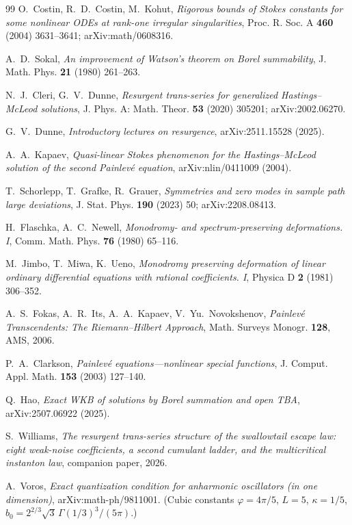 \documentclass[11pt,reqno]{amsart}
\theoremstyle{plain}
\theoremstyle{definition}
\theoremstyle{remark}
\begin{document}
\begin{thebibliography}{99}
 O.~Costin, R.~D.~Costin, M.~Kohut, \emph{Rigorous bounds of Stokes constants for some
nonlinear ODEs at rank-one irregular singularities}, Proc. R. Soc. A \textbf{460} (2004) 3631--3641;
arXiv:math/0608316.

 A.~D.~Sokal, \emph{An improvement of Watson's theorem on Borel summability},
J. Math. Phys. \textbf{21} (1980) 261--263.

 N.~J.~Cleri, G.~V.~Dunne, \emph{Resurgent trans-series for generalized
Hastings--McLeod solutions}, J. Phys. A: Math. Theor. \textbf{53} (2020) 305201; arXiv:2002.06270.

 G.~V.~Dunne, \emph{Introductory lectures on resurgence}, arXiv:2511.15528 (2025).

 A.~A.~Kapaev, \emph{Quasi-linear Stokes phenomenon for the Hastings--McLeod
solution of the second Painlev\'e equation}, arXiv:nlin/0411009 (2004).

 T.~Schorlepp, T.~Grafke, R.~Grauer, \emph{Symmetries and zero modes in sample path
large deviations}, J. Stat. Phys. \textbf{190} (2023) 50; arXiv:2208.08413.

 H.~Flaschka, A.~C.~Newell, \emph{Monodromy- and spectrum-preserving deformations. I},
Comm. Math. Phys. \textbf{76} (1980) 65--116.

 M.~Jimbo, T.~Miwa, K.~Ueno, \emph{Monodromy preserving deformation of linear
ordinary differential equations with rational coefficients. I}, Physica D \textbf{2} (1981) 306--352.

 A.~S.~Fokas, A.~R.~Its, A.~A.~Kapaev, V.~Yu.~Novokshenov, \emph{Painlev\'e
Transcendents: The Riemann--Hilbert Approach}, Math. Surveys Monogr. \textbf{128}, AMS, 2006.

 P.~A.~Clarkson, \emph{Painlev\'e equations---nonlinear special functions},
J. Comput. Appl. Math. \textbf{153} (2003) 127--140.

 Q.~Hao, \emph{Exact WKB of solutions by Borel summation and open TBA},
arXiv:2507.06922 (2025).

 S.~Williams, \emph{The resurgent trans-series structure of the
swallowtail escape law: eight weak-noise coefficients, a second cumulant ladder, and the
multicritical instanton law}, companion paper, 2026.

 A.~Voros, \emph{Exact quantization condition for anharmonic oscillators
(in one dimension)}, arXiv:math-ph/9811001. (Cubic constants $\varphi=4\pi/5$, $L=5$,
$\kappa=1/5$, $b_0=2^{2/3}\sqrt3\,\Gamma(1/3)^3/(5\pi)$.)


\end{thebibliography}
\end{document}
